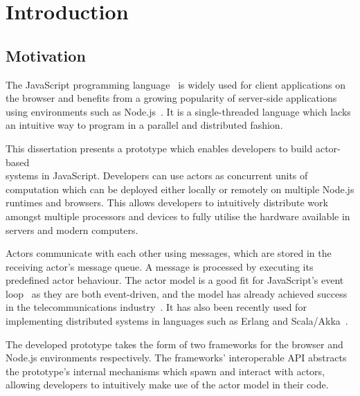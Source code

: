 \documentclass[oneside]{um-fict}
\begin{document}
\tableofcontents*\if@openright\cleardoublepage\else\clearpage\fi
\listoffigures*\if@openright\cleardoublepage\else\clearpage
\listoftables*\if@openright\cleardoublepage\else\clearpage

\mainmatter
\chapter{Introduction}\label{chap:intro}
\section{Motivation}
The JavaScript programming language~\cite{ecmascript} is widely used for client applications on the browser and benefits from a growing popularity of server-side applications using environments such as Node.js~\cite{nodejs}. It is a single-threaded language which lacks an intuitive way to program in a parallel and distributed fashion. 

This dissertation presents a prototype which enables developers to build actor-based\\\cite{hewitt1973session, 43years} systems in JavaScript. Developers can use actors as concurrent units of computation which can be deployed either locally or remotely on multiple Node.js runtimes and browsers. This allows developers to intuitively distribute work amongst multiple processors and devices to fully utilise the hardware available in servers and modern computers.

Actors communicate with each other using messages, which are stored in the receiving actor's message queue. A message is processed by executing its predefined actor behaviour. The actor model is a good fit for JavaScript's event loop~\cite{eventloopbrowser, eventloopnode} as they are both event-driven, and the model has already achieved success in the telecommunications industry~\cite{erlang}. It has also been recently used for implementing distributed systems in languages such as Erlang and Scala/Akka~\cite{haller2012integration}.

The developed prototype takes the form of two frameworks for the browser and Node.js environments respectively. The frameworks' interoperable API abstracts the prototype's internal mechanisms which spawn and interact with actors, allowing developers to intuitively make use of the actor model in their code.
\end{document}

